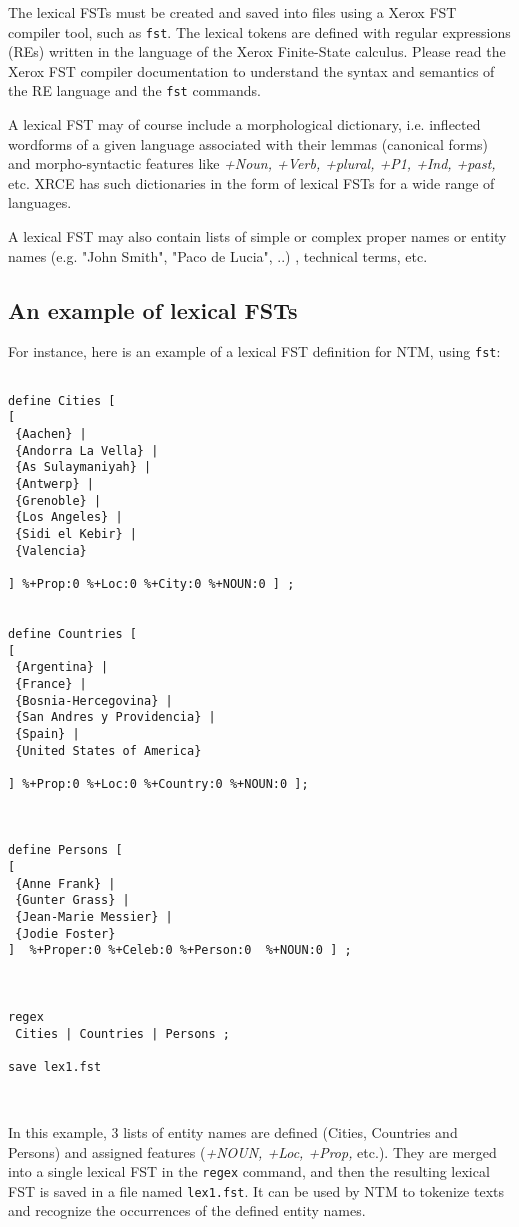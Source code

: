 \documentclass{article}
\newcommand{\tool}[1]{{\tt #1}}
\newcommand{\comm}[1]{{\tt #1}}
\newcommand{\filename}[1]{{\tt #1}}
\newcommand{\feats}[1]{{\it #1}}
\begin{document}
The lexical FSTs must be created and saved into files using a Xerox FST compiler tool, such as \tool{fst}. The lexical tokens are defined with regular expressions (REs) written in the language of the Xerox Finite-State calculus. Please read the Xerox FST compiler documentation to understand the syntax and semantics of the RE language and the \tool{fst} commands.

A lexical FST may of course include a morphological dictionary, i.e. inflected wordforms of a given language associated with their lemmas (canonical forms) and morpho-syntactic features like \feats{+Noun, +Verb, +plural, +P1, +Ind, +past,} etc. XRCE has such dictionaries in the form of lexical FSTs for a wide range of languages.

A lexical FST  may also contain lists of simple or complex proper names or entity names (e.g. "John Smith", "Paco de Lucia", ..) , technical terms, etc.


\subsection{An example of lexical FSTs}
\label{FSTexample}

For instance, here is an example of a lexical FST definition for NTM, using \tool{fst}:

\begin{verbatim}

define Cities [
[
 {Aachen} |
 {Andorra La Vella} |
 {As Sulaymaniyah} |
 {Antwerp} |
 {Grenoble} |
 {Los Angeles} |
 {Sidi el Kebir} |
 {Valencia}

] %+Prop:0 %+Loc:0 %+City:0 %+NOUN:0 ] ;


define Countries [
[
 {Argentina} |
 {France} |
 {Bosnia-Hercegovina} |
 {San Andres y Providencia} |
 {Spain} |
 {United States of America}

] %+Prop:0 %+Loc:0 %+Country:0 %+NOUN:0 ];



define Persons [
[
 {Anne Frank} |
 {Gunter Grass} |
 {Jean-Marie Messier} |
 {Jodie Foster}
]  %+Proper:0 %+Celeb:0 %+Person:0  %+NOUN:0 ] ;



regex 
 Cities | Countries | Persons ;

save lex1.fst



\end{verbatim}

In this example, 3 lists of entity names are defined (Cities, Countries and Persons) and assigned features (\feats{+NOUN, +Loc, +Prop,} etc.). They are merged into a single lexical FST in the \comm{regex} command, and then the resulting lexical FST is saved in a file named \filename{lex1.fst}. It can be used by NTM to tokenize texts and recognize the occurrences of the defined entity names.
\end{document}

